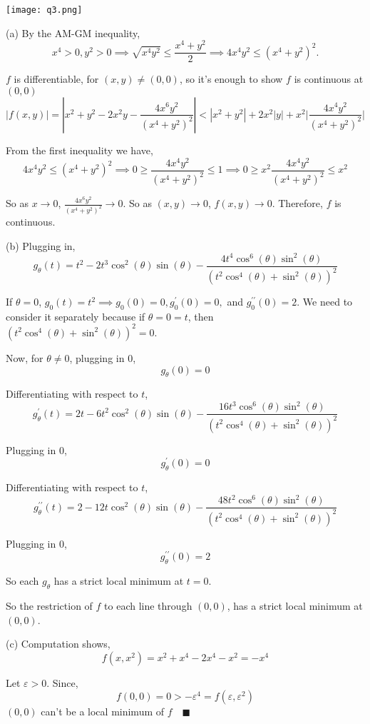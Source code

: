 \documentclass{article}
\begin{document}
\texttt{[image: q3.png]}


(a) By the AM-GM inequality,
\[x^4>0, y^2 >0 \implies \sqrt{x^4y^2} \leq \frac{x^4+y^2}{2}
  \implies 4x^4y^2 \leq ({x^4+y^2})^{2}.\]

$f$ is differentiable, for $(x,y)\neq (0,0)$, so it's enough to show
$f$ is continuous at $(0,0)$
\[|f(x,y)| = |x^2+y^2 -2x^2y - \frac{4x^6y^2}{({x^4+y^2})^{2}}| <
  |x^2+y^2| +2x^2|y| +x^2\bigg|\frac{4x^4y^2}{({x^4+y^2})^{2}}\bigg|\]

From the first inequality we have,
\[4x^4y^2 \leq ({x^4+y^2})^{2} \implies 0 \geq
  \frac{4x^4y^2}{({x^4+y^2})^{2}} \leq 1 \implies 0 \geq x^2
  \frac{4x^4y^2}{({x^4+y^2})^{2}} \leq x^2\]

So as $x\rightarrow 0$, $\frac{4x^6y^2}{({x^4+y^2})^{2}} \rightarrow
0$. So as $(x,y)\rightarrow 0$, $f(x,y)\rightarrow 0$. Therefore, $f$
is continuous.

(b) Plugging in,
\[g_\theta(t) =  t^2 -2t^3\cos^2(\theta)\sin(\theta)
  -\frac{4t^4\cos^6(\theta)\sin^2(\theta)}{(t^2\cos^4(\theta)+\sin^2(\theta))^2}\]

If $\theta =  0$, $g_0(t) = t^2\implies g_0(0) = 0,g^\prime_0(0) = 0,$
and $g^{\prime\prime}_{0}(0) = 2$. We need to consider it separately
because if $\theta =  0 = t$, then
$(t^2\cos^4(\theta)+\sin^2(\theta))^2 = 0$.

Now, for $\theta \neq 0$, plugging in $0$,
\[g_\theta(0) =  0\]

Differentiating with respect to $t$,
\[g^{\prime}_\theta(t) =  2t -6t^2\cos^2(\theta)\sin(\theta)
  -\frac{16t^3\cos^6(\theta)\sin^2(\theta)}{(t^2\cos^4(\theta)+\sin^2(\theta))^2}\]

Plugging in $0$,
\[g_\theta^\prime(0) =  0\]

Differentiating with respect to $t$,
\[g_\theta^{\prime\prime}(t) =  2 -12t\cos^2(\theta)\sin(\theta)
  -\frac{48t^2\cos^6(\theta)\sin^2(\theta)}{(t^2\cos^4(\theta)+\sin^2(\theta))^2}\]

Plugging in $0$,
\[g_\theta^{\prime\prime}(0) =  2\]

So each $g_\theta$ has a strict local minimum at $t=0$.

So the restriction of $f$ to each line through $(0,0)$, has a strict
local minimum at $(0,0)$.

(c)
Computation shows,
\[f(x,x^2) = x^2 +x^4-2x^4 -x^2 = -x^4\]

Let $\varepsilon > 0 $. Since, \[f(0,0) = 0 > -\varepsilon^4 =
  f(\varepsilon,\varepsilon^2)\]
$(0,0)$ can't be a local minimum of $f\quad \blacksquare$
\end{document}
